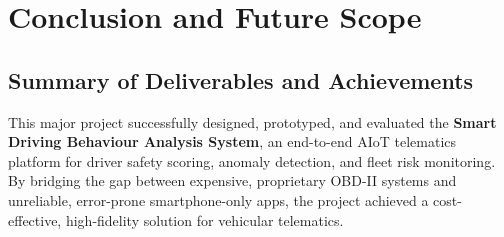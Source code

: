 \chapter{Conclusion and Future Scope}
\label{chap:conclusion}

\section{Summary of Deliverables and Achievements}
\label{sec:conclusion_summary}
This major project successfully designed, prototyped, and evaluated the \textbf{Smart Driving Behaviour Analysis System}, an end-to-end AIoT telematics platform for driver safety scoring, anomaly detection, and fleet risk monitoring. By bridging the gap between expensive, proprietary OBD-II systems and unreliable, error-prone smartphone-only apps, the project achieved a cost-effective, high-fidelity solution for vehicular telematics.


